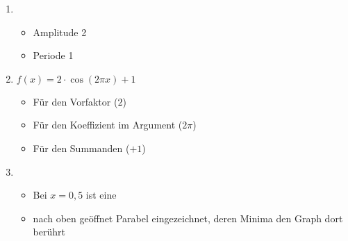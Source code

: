 \item
\begin{enumerate}

\item
\begin{itemize}
\item Amplitude 2
\item Periode 1
\end{itemize}

\item $f(x) = 2\cdot\cos(2\pi x) + 1$
\begin{itemize}
\item Für den Vorfaktor ($2$)
\item Für den Koeffizient im Argument ($2\pi$)
\item Für den Summanden ($+1$)
\end{itemize}

\item 
\begin{itemize}
\item Bei $x=0{,}5$ ist eine
\item nach oben geöffnet Parabel eingezeichnet, deren Minima den Graph dort berührt
\end{itemize}

\end{enumerate}

